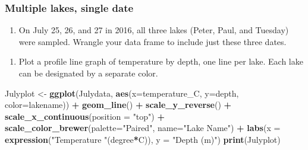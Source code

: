 \documentclass[]{article}
\newenvironment{Shaded}{\begin{snugshade}}{\end{snugshade}}
\newcommand{\CommentTok}[1]{\textcolor[rgb]{0.56,0.35,0.01}{\textit{#1}}}
\newcommand{\DataTypeTok}[1]{\textcolor[rgb]{0.13,0.29,0.53}{#1}}
\newcommand{\KeywordTok}[1]{\textcolor[rgb]{0.13,0.29,0.53}{\textbf{#1}}}
\newcommand{\NormalTok}[1]{#1}
\newcommand{\OperatorTok}[1]{\textcolor[rgb]{0.81,0.36,0.00}{\textbf{#1}}}
\newcommand{\StringTok}[1]{\textcolor[rgb]{0.31,0.60,0.02}{#1}}
\providecommand{\tightlist}{%
  \setlength{\itemsep}{0pt}\setlength{\parskip}{0pt}}
\begin{document}
\hypertarget{multiple-lakes-single-date}{%
\subsubsection{Multiple lakes, single
date}\label{multiple-lakes-single-date}}

\begin{enumerate}
\def\labelenumi{\arabic{enumi}.}
\setcounter{enumi}{7}
\tightlist
\item
  On July 25, 26, and 27 in 2016, all three lakes (Peter, Paul, and
  Tuesday) were sampled. Wrangle your data frame to include just these
  three dates.
\end{enumerate}

\begin{Shaded}
\end{Shaded}

\begin{enumerate}
\def\labelenumi{\arabic{enumi}.}
\setcounter{enumi}{8}
\tightlist
\item
  Plot a profile line graph of temperature by depth, one line per lake.
  Each lake can be designated by a separate color.
\end{enumerate}

\begin{Shaded}
\begin{Highlighting}[]
\NormalTok{Julyplot <-}\StringTok{ }\KeywordTok{ggplot}\NormalTok{(Julydata, }\KeywordTok{aes}\NormalTok{(}\DataTypeTok{x=}\NormalTok{temperature_C, }\DataTypeTok{y=}\NormalTok{depth, }\DataTypeTok{color=}\NormalTok{lakename)) }\OperatorTok{+}
\StringTok{  }\KeywordTok{geom_line}\NormalTok{() }\OperatorTok{+}
\StringTok{  }\KeywordTok{scale_y_reverse}\NormalTok{() }\OperatorTok{+}
\StringTok{  }\KeywordTok{scale_x_continuous}\NormalTok{(}\DataTypeTok{position =} \StringTok{"top"}\NormalTok{) }\OperatorTok{+}
\StringTok{  }\KeywordTok{scale_color_brewer}\NormalTok{(}\DataTypeTok{palette=}\StringTok{"Paired"}\NormalTok{, }\DataTypeTok{name=}\StringTok{"Lake Name"}\NormalTok{) }\OperatorTok{+}
\StringTok{  }\KeywordTok{labs}\NormalTok{(}\DataTypeTok{x =} \KeywordTok{expression}\NormalTok{(}\StringTok{"Temperature "}\NormalTok{(degree}\OperatorTok{*}\NormalTok{C)), }\DataTypeTok{y =} \StringTok{"Depth (m)"}\NormalTok{)}
\KeywordTok{print}\NormalTok{(Julyplot)}
\end{Highlighting}
\end{Shaded}
\end{document}
